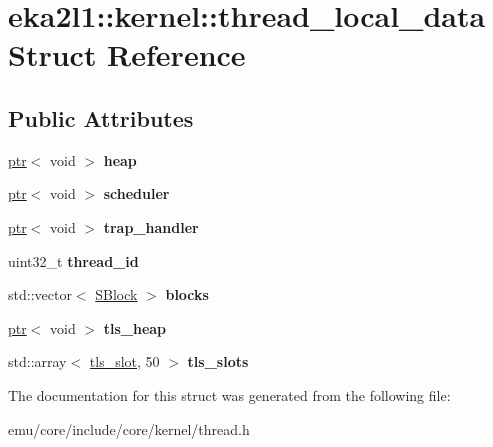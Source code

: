 \hypertarget{structeka2l1_1_1kernel_1_1thread__local__data}{}\section{eka2l1\+:\+:kernel\+:\+:thread\+\_\+local\+\_\+data Struct Reference}
\label{structeka2l1_1_1kernel_1_1thread__local__data}
\subsection*{Public Attributes}
\begin{DoxyCompactItemize}
\item 
\mbox{\label{structeka2l1_1_1kernel_1_1thread__local__data_a13162a487be559a665b2b2339075bfc9}} 
\mbox{\hyperlink{classeka2l1_1_1ptr}{ptr}}$<$ void $>$ {\bfseries heap}
\item 
\mbox{\label{structeka2l1_1_1kernel_1_1thread__local__data_a7ab489612016197d6745cc3a178401d4}} 
\mbox{\hyperlink{classeka2l1_1_1ptr}{ptr}}$<$ void $>$ {\bfseries scheduler}
\item 
\mbox{\label{structeka2l1_1_1kernel_1_1thread__local__data_a43498071cd4e4472c64f6940310ade07}} 
\mbox{\hyperlink{classeka2l1_1_1ptr}{ptr}}$<$ void $>$ {\bfseries trap\+\_\+handler}
\item 
\mbox{\label{structeka2l1_1_1kernel_1_1thread__local__data_a8976bff2f9f5683f0d66d2c7e337afab}} 
uint32\+\_\+t {\bfseries thread\+\_\+id}
\item 
\mbox{\label{structeka2l1_1_1kernel_1_1thread__local__data_a014937c0bf922bf06f423c2b3bd40f23}} 
std\+::vector$<$ \mbox{\hyperlink{structeka2l1_1_1kernel_1_1_s_block}{S\+Block}} $>$ {\bfseries blocks}
\item 
\mbox{\label{structeka2l1_1_1kernel_1_1thread__local__data_aa319b9c554f546ce13fc2c1c9e7e3164}} 
\mbox{\hyperlink{classeka2l1_1_1ptr}{ptr}}$<$ void $>$ {\bfseries tls\+\_\+heap}
\item 
\mbox{\label{structeka2l1_1_1kernel_1_1thread__local__data_a26e039b661db674896f6c98f51195312}} 
std\+::array$<$ \mbox{\hyperlink{structeka2l1_1_1kernel_1_1tls__slot}{tls\+\_\+slot}}, 50 $>$ {\bfseries tls\+\_\+slots}
\end{DoxyCompactItemize}


The documentation for this struct was generated from the following file\+:\begin{DoxyCompactItemize}
\item 
emu/core/include/core/kernel/thread.\+h\end{DoxyCompactItemize}
